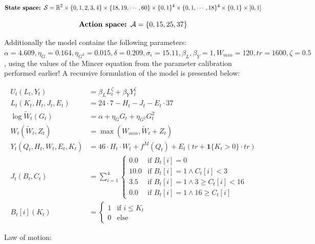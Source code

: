 \begin{equation}
    \textbf{State space: }\mathcal{S} = \mathbb{R}^2 \times \{0, 1, 2, 3, 4\} \times \{18, 19, \cdots , 60\} \times \{0, 1\}^4 \times \{0, 1, \cdots, 18\}^4 \times \{0,1\} \times [0, 1]
\end{equation}

\begin{equation}
    \textbf{Action space: }\mathcal{A} = \{0, 15, 25, 37\}
\end{equation}

Additionally the model contains the following parameters: $\alpha=4.609, \eta_G = 0.164, \eta_{G^{2}}=0.015, \delta=0.209, \sigma_\epsilon = 15.11, \beta_L, \beta_Y = 1, W_{min} = 120, tr = 1600, \zeta=0.5$, using the values of the Mincer equation from the parameter calibration performed earlier! A recursive formulation of the model is presented below:

\begin{align}
    U_t(L_t, Y_t) &= \beta_L L_t^{\zeta} + \beta_Y Y_t^{\zeta}\\
    L_t(K_t, H_t, J_t, E_t) &= 24 \cdot 7 - H_t - J_t - E_t \cdot 37\\
    \log \tilde{W}_t (G_t) &= \alpha + \eta_G G_t + \eta_{G^2} G_t^2 \\
    W_t(\tilde{W}_t, Z_t) &= \max(W_{min} , \tilde{W}_t  + Z_t)  \\
    Y_t(Q_t,H_t, W_t, E_t, K_t) &= 46 \cdot H_t \cdot W_t + f^M(Q_t) +  E_t (tr + \mathbf{1} \{ K_t > 0 \} \cdot tr)\\
    J_t (B_t, C_t) &= \sum_{i=1}^4 \begin{cases}
        0.0 & \text{if } B_t[i] = 0 \\
        10.0 & \text{if } B_t[i] = 1 \land C_t[i] < 3 \\
        3.5 & \text{if } B_t[i] = 1 \land 3 \geq C_t[i] < 16 \\
        0.0 & \text{if } B_t[i] = 1 \land  16 \geq  C_t[i] 
    \end{cases} \\
    B_t[i] (K_t) &= \begin{cases}
        1 & \text{if }  i \leq K_t \\
        0 & \text{else}
    \end{cases}
\end{align}

Law of motion:

